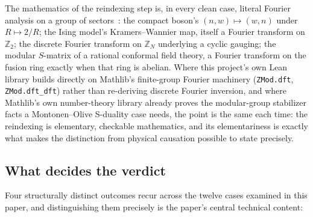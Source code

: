 \documentclass[11pt,a4paper]{article}
\newcommand{\lean}[1]{\texttt{\small #1}}
\begin{document}
The mathematics of the reindexing step is, in every clean case, literal Fourier analysis on a group of
sectors~\cite{Savit1980}: the compact boson's $(n,w)\mapsto(w,n)$ under $R\mapsto2/R$; the Ising
model's Kramers--Wannier map, itself a Fourier transform on $\mathbb Z_2$; the discrete Fourier
transform on $\mathbb Z_N$ underlying a cyclic gauging; the modular $S$-matrix of a rational conformal
field theory, a Fourier transform on the fusion ring exactly when that ring is abelian. Where this
project's own Lean library builds directly on Mathlib's finite-group Fourier machinery
(\lean{ZMod.dft}, \lean{ZMod.dft\_dft}) rather than re-deriving discrete Fourier inversion, and where
Mathlib's own number-theory library already proves the modular-group stabilizer facts a Montonen--Olive
S-duality case needs, the point is the same each time: the reindexing is elementary, checkable
mathematics, and its elementariness is exactly what makes the distinction from physical causation
possible to state precisely.

\subsection*{What decides the verdict}

Four structurally distinct outcomes recur across the twelve cases examined in this paper, and
distinguishing them precisely is the paper's central technical content:
\end{document}
